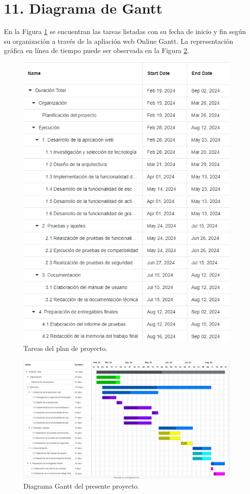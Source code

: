 \documentclass[
11pt, %
codirector, %
]{charter}
\begin{document}
\section{11. Diagrama de Gantt}
\label{sec:gantt}
En la Figura \ref{fig:Tasks} se encuentran las tareas listadas con su fecha de inicio y fin según su organización a través de la apliación web Online Gantt. La representación gráfica en línea de tiempo puede ser observada en la Figura \ref{fig:Gantt}.
\begin{figure}[htpb]
\centering 
\includegraphics[width=.9\textwidth]{./Figuras/tareas.png}
\caption{Tareas del plan de proyecto.}
\label{fig:Tasks}
\end{figure}

\begin{figure}
    \centering 
    \includegraphics[width=.9\textwidth]{./Figuras/gantt.png}
    \caption{Diagrama Gantt del presente proyecto.}
    \label{fig:Gantt}
\end{figure}
\end{document}
